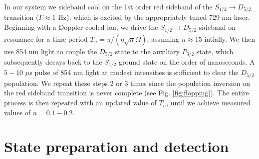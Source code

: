 In our system we sideband cool on the 1st order red sideband of the $S_{1/2} \rightarrow D_{5/2}$ transition ($\Gamma \approx 1$ Hz), which is excited by the appropriately tuned 729 nm laser. Beginning with a Doppler cooled ion, we drive the $S_{1/2} \rightarrow D_{5/2}$ sideband on resonance for a time period $T_n = \pi / (\eta \sqrt{n} \Omega)$, assuming $n \approx 15$ intially. We then use 854 nm light to couple the $D_{5/2}$ state to the auxiliary $ P_{3/2}$ state, which subsequently decays back to the $S_{1/2}$ ground state on the order of nanoseconds. A $5-10$ $\mu$s pulse of 854 nm light at modest intensities is sufficient to clear the $D_{5/2}$ population. We repeat these steps 2 or 3 times since the population inversion on the red sideband transition is never complete (see Fig. \ref{fig:flopping}). The entire process is then repeated with an updated value of $T_n$, until we achieve measured values of $\bar{n} = 0.1-0.2$. 







\section{State preparation and detection}

